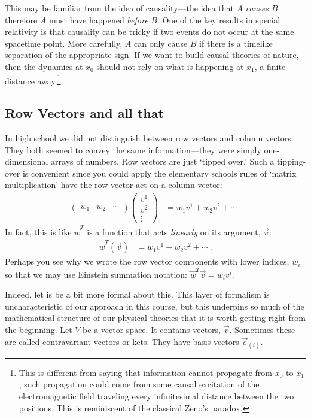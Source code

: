 This may be familiar from the idea of causality---the idea that $A$ \emph{causes} $B$ therefore $A$ must have happened \emph{before} $B$. One of the key results in special relativity is that causality can be tricky if two events do not occur at the same spacetime point. More carefully, $A$ can only cause $B$ if there is a timelike separation of the appropriate sign.  If we want to build causal theories of nature, then the dynamics at $x_0$ should not rely on what is happening at $x_1$, a finite distance away.\footnote{This is different from saying that information cannot propagate from $x_0$ to $x_1$; such propagation could come from some causal excitation of the electromagnetic field traveling every infinitesimal distance between the two positions. This is reminiscent of the classical Zeno's paradox.}


 

\subsection{Row Vectors and all that}

In high school we did not distinguish between row vectors and column vectors. They both seemed to convey the same information---they were simply one-dimensional arrays of numbers. Row vectors are just `tipped over.’ Such a tipping-over is convenient since you could apply the elementary schools rules of `matrix multiplication' have the row vector act on a column vector:
\begin{align}
  \begin{pmatrix}
    w_1 & w_2 & \cdots
  \end{pmatrix}
  \begin{pmatrix}
    v^1 \\
    v^2 \\
    \vdots
  \end{pmatrix}
  &= 
  w_1 v^1 + w_2 v^2 + \cdots \ .
\end{align}
In fact, this is like $\vec{w}^T$ is a function that acts \emph{linearly} on its argument, $\vec{v}$: 
\begin{align}
  \vec{w}^T(\vec v) &= w_1 v^1 + w_2 v^2 + \cdots \ .
  \label{eq:oneform:eats:vector}
\end{align}
Perhaps you see why we wrote the row vector components with lower indices, $w_i$ so that we may use Einstein summation notation: $\vec{w}^T\vec{v} = w_iv^i$.

Indeed, let is be a bit more formal about this. This layer of formalism is uncharacteristic of our approach in this course, but this underpins so much of the mathematical structure of our physical theories that it is worth getting right from the beginning. 
%
Let $V$ be a vector space. It contains vectors, $\vec{v}$. Sometimes these are called contravariant vectors or kets. They have basis vectors $\vec{e}_{(i)}$. 

